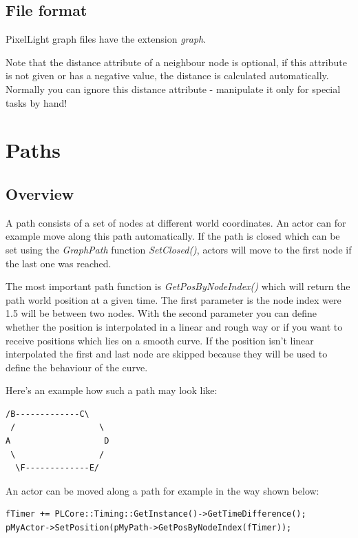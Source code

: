\subsection{File format}
PixelLight graph files have the extension \emph{graph}.

Note that the distance attribute of a neighbour node is optional, if this attribute is not given or has a negative value, the distance is calculated automatically. Normally you can ignore this distance attribute - manipulate it only for special tasks by hand!





\section{Paths}



\subsection{Overview}
A path consists of a set of nodes at different world coordinates. An actor can for example move along this path automatically. If the path is closed which can be set using the \emph{GraphPath} function \emph{SetClosed()}, actors will move to the first node if the last one was reached.

The most important path function is \emph{GetPosByNodeIndex()} which will return the path world position at a given time. The first parameter is the node index were 1.5 will be between two nodes. With the second parameter you can define whether the position is interpolated in a linear and rough way or if you want to receive positions which lies on a smooth curve. If the position isn't linear interpolated the first and last node are skipped because they will be used to define the behaviour of the curve.

Here's an example how such a path may look like:

\begin{lstlisting}[caption=Path example]
  /B-------------C\
 /                 \
A                   D
 \                 /
  \F-------------E/
\end{lstlisting}

An actor can be moved along a path for example in the way shown below:

\begin{lstlisting}[caption=Moving along path]
fTimer += PLCore::Timing::GetInstance()->GetTimeDifference();
pMyActor->SetPosition(pMyPath->GetPosByNodeIndex(fTimer));
\end{lstlisting}

